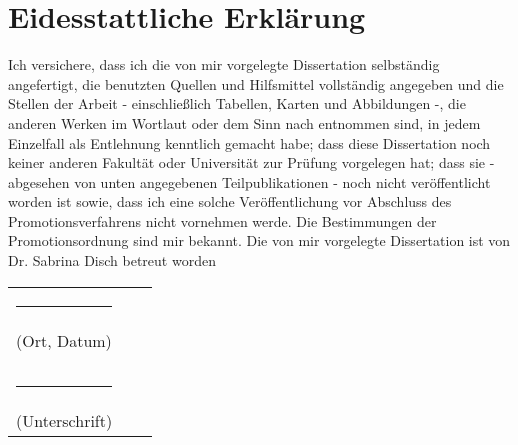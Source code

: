 \documentclass[\main/dresen_thesis.tex]{subfiles}
\begin{document}
  \section*{Eidesstattliche Erklärung}
  \smallskip\par\noindent 
  Ich versichere, dass ich die von mir vorgelegte Dissertation selbständig
  angefertigt, die benutzten Quellen und Hilfsmittel vollständig angegeben und die
  Stellen der Arbeit - einschließlich Tabellen, Karten und Abbildungen -, die
  anderen Werken im Wortlaut oder dem Sinn nach entnommen sind, in jedem
  Einzelfall als Entlehnung kenntlich gemacht habe; dass diese Dissertation noch 
  keiner anderen Fakultät oder Universität zur Prüfung vorgelegen hat; dass sie -
  abgesehen von unten angegebenen Teilpublikationen - noch nicht veröffentlicht
  worden ist sowie, dass ich eine solche Veröffentlichung vor Abschluss des
  Promotionsverfahrens nicht vornehmen werde. Die Bestimmungen der
  Promotionsordnung sind mir bekannt. Die von mir vorgelegte Dissertation ist von
  Dr. Sabrina Disch betreut worden


  \vspace{3cm}
  \begin{tabular}{lll}
      \rule{5cm}{1pt} & \hspace{2cm} & \\
      (Ort, Datum) & &\\\\\\
      \rule{5cm}{1pt}& \hspace{2cm} & \\
      (Unterschrift)
  \end{tabular}
\end{document}
